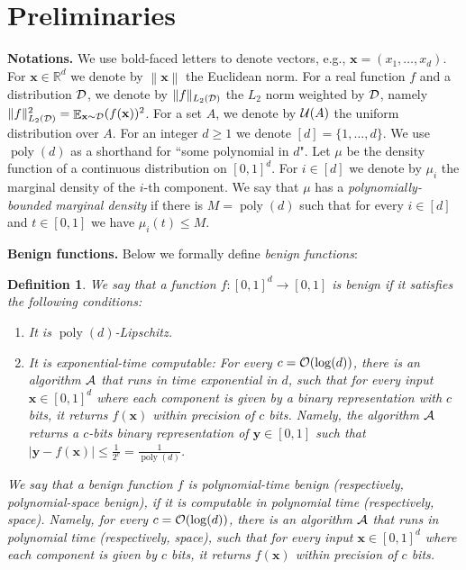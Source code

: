 \documentclass[11pt]{article}
\newtheorem{definition}{Definition}[section]
\newcommand{\onefunc}{\mathbbm{1}}
\newcommand{\bx}{\mathbf{x}}
\newcommand{\by}{\mathbf{y}}
\newcommand{\co}{{\cal O}}
\newcommand{\ca}{{\cal A}}
\newcommand{\cd}{{\cal D}}
\newcommand{\cu}{{\cal U}}
\newcommand{\reals}{{\mathbb R}}
\DeclareMathOperator{\poly}{poly}
\DeclareMathOperator*{\E}{\mathbb{E}}
\newcommand{\norm}[1]{\left\|#1\right\|}
\newcommand{\snorm}[1]{\|#1\|} %
\begin{document}
\section{Preliminaries}
\label{sec:preliminaries}

\textbf{Notations.}
We use bold-faced letters to denote vectors, e.g., $\bx=(x_1,\ldots,x_d)$. For $\bx \in \reals^d$ we denote by $\norm{\bx}$ the Euclidean norm. For a 
real
function 
$f$
and a distribution $\cd$,
we denote by $\snorm{f}_{L_2(\cd)}$ the $L_2$ norm weighted by $\cd$, namely $\snorm{f}_{L_2(\cd)}^2 = \E_{\bx \sim \cd}(f(\bx))^2$. 
For a set $A$, 
we
denote by $\cu(A)$ the uniform distribution over $A$.
For an integer $d \geq 1$ we denote $[d]=\{1,\ldots,d\}$. 
We use $\poly(d)$ as a shorthand for ``some polynomial in $d$".
Let $\mu$ be the density function of a continuous distribution on $[0,1]^d$.
For $i \in [d]$ we denote by $\mu_i$ the marginal density of the $i$-th component.
We say that $\mu$ has a {\em polynomially-bounded marginal density} if there is $M = \poly(d)$ such that for every $i \in [d]$ and $t \in [0,1]$ we have $\mu_i(t) \leq M$.

\textbf{Benign functions.} Below we formally define {\em benign functions}:
\begin{definition}
	We say that a function $f:[0,1]^d \rightarrow [0,1]$ is {\em benign} if it satisfies the following conditions:
	\begin{enumerate}
		\item  It is $\poly(d)$-Lipschitz.
		\item It is exponential-time computable: For every $c=\co(\log(d))$, there is an algorithm $\ca$ that runs in time exponential in $d$, such that for every input $\bx \in [0,1]^d$ where each component is given by a binary representation with $c$ bits, it returns $f(\bx)$ within precision of $c$ bits. Namely, the algorithm $\ca$ returns a $c$-bits binary representation of $\by \in [0,1]$ such that $|\by-f(\bx)| \leq \frac{1}{2^c}=\frac{1}{\poly(d)}$.
	\end{enumerate}
	We say that a benign function $f$ is {\em polynomial-time benign} (respectively, {\em polynomial-space benign}), if it is computable in polynomial time (respectively, space). Namely, for every $c=\co(\log(d))$, there is an algorithm $\ca$ that runs in polynomial time (respectively, space), such that for every input $\bx \in [0,1]^d$ where each component is given by $c$ bits, it returns $f(\bx)$ within precision of $c$ bits.
\end{definition}
\end{document}
